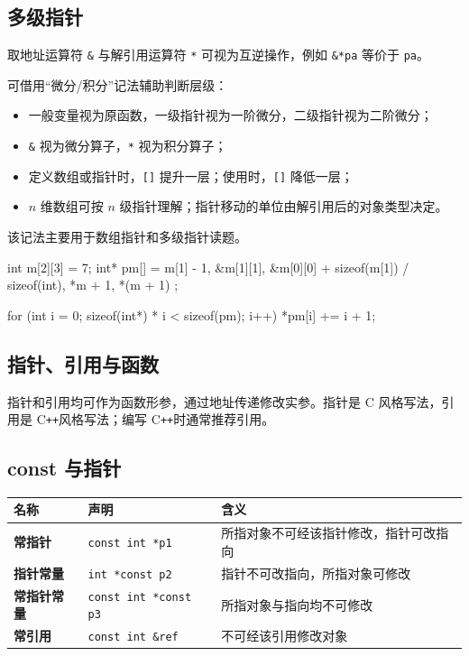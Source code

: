 \documentclass[UTF8,fontset=fandol,zihao=5]{ctexart}
\newcommand{\code}[1]{\texttt{#1}}
\newcommand{\cpp}{C\texttt{++}}
\begin{document}
\subsection{多级指针}

取地址运算符 \code{\&} 与解引用运算符 \code{*} 可视为互逆操作，例如 \code{\&*pa} 等价于 \code{pa}。

\begin{method}[数组指针分析]
可借用“微分/积分”记法辅助判断层级：
\begin{itemize}
  \item 一般变量视为原函数，一级指针视为一阶微分，二级指针视为二阶微分；
  \item \code{\&} 视为微分算子，\code{*} 视为积分算子；
  \item 定义数组或指针时，\code{[]} 提升一层；使用时，\code{[]} 降低一层；
  \item $n$ 维数组可按 $n$ 级指针理解；指针移动的单位由解引用后的对象类型决定。
\end{itemize}
该记法主要用于数组指针和多级指针读题。
\end{method}

\begin{cppcode}[多级指针例]
int m[2][3] = {7};
int* pm[] = {
    m[1] - 1,
    &m[1][1],
    &m[0][0] + sizeof(m[1]) / sizeof(int),
    *m + 1,
    *(m + 1)
};

for (int i = 0; sizeof(int*) * i < sizeof(pm); i++) {
    *pm[i] += i + 1;
}
\end{cppcode}

\subsection{指针、引用与函数}

指针和引用均可作为函数形参，通过地址传递修改实参。指针是 C 风格写法，引用是 \cpp 风格写法；编写 \cpp 时通常推荐引用。

\subsection{const 与指针}

\begin{center}
\begin{tabularx}{0.94\textwidth}{>{\bfseries}p{2.8cm}p{5.5cm}X}
\toprule
名称 & 声明 & 含义 \\
\midrule
常指针 & \code{const int *p1} & 所指对象不可经该指针修改，指针可改指向 \\
指针常量 & \code{int *const p2} & 指针不可改指向，所指对象可修改 \\
常指针常量 & \code{const int *const p3} & 所指对象与指向均不可修改 \\
常引用 & \code{const int \&ref} & 不可经该引用修改对象 \\
\bottomrule
\end{tabularx}
\end{center}
\end{document}
